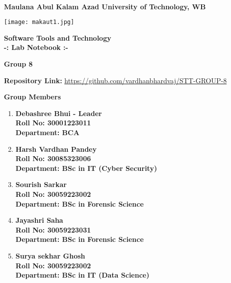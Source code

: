 \documentclass[a4paper,12pt]{article}
\begin{document}
\begin{titlepage}
    \centering
    \vspace*{0 cm}
    \Large\\
    \textbf{Maulana Abul Kalam Azad University of Technology, WB}
    \vspace{0.5cm}
    
    \texttt{[image: makaut1.jpg]} %
    \vspace{0.5cm}
    
    \LARGE
    \textbf{{Software Tools and Technology\\
        -: Lab Notebook :-}}
    \vspace{0.5cm}
    
    \large
    \textbf{Group 8}
    \vspace{1 cm}
    
    \textbf{Repository Link:} \href{https://github.com/Rajarshi-2005/LaTeX-Group-11}{https://github.com/vardhanbhardvaj/STT-GROUP-8}
    \vspace{1cm}
    
    \textbf{Group Members}
    \vspace{0.5cm}

    \normalsize
    \begin{enumerate}
       \item \textbf{Debashree Bhui - Leader}\\
              \textbf{Roll No: 30001223011}\\
              \textbf{Department: BCA}
         \item \textbf{Harsh Vardhan Pandey}\\
              \textbf{Roll No: 30085323006}\\
              \textbf{Department: BSc in IT (Cyber Security)}
        \item \textbf{Sourish Sarkar}\\
              \textbf{Roll No: 30059223002}\\
              \textbf{Department: BSc in Forensic Science}
        \item \textbf{Jayashri Saha}\\
              \textbf{Roll No: 30059223031}\\
              \textbf{Department: BSc in Forensic Science}
        \item \textbf{Surya sekhar Ghosh}\\
              \textbf{Roll No: 30059223002}\\
              \textbf{Department: BSc in IT (Data Science)}
    \end{enumerate}
    \vspace{0.8 cm}

    \end{titlepage}
\end{document}
